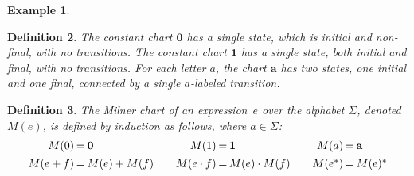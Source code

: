 \documentclass{article}
\newtheorem{definition}{Definition}[section]
\newtheorem{example}[definition]{Example}
\newcommand{\milner}[1]{M(#1)}
\begin{document}
\begin{example}
\begin{center}
\end{center}
\end{example}


\begin{definition}
The constant chart $\mathbf{0}$ has a single state, which is initial and non-final, with no transitions.  
The constant chart $\mathbf{1}$ has a single state, both initial and final, with no transitions.  
For each letter $a$, the chart $\mathbf{a}$ has two states, one initial and one final, 
connected by a single $a$-labeled transition.
\end{definition}

\begin{definition}
The \emph{Milner chart} of an expression~$e$ over the alphabet $\Sigma$, denoted $M(e)$, is defined by induction as follows, 
where  $a \in \Sigma$:
\[
\begin{array}{rclcrclcrcl}
\milner{0} &\hspace{-8pt}=\hspace{-8pt}& \mathbf{0} & &
\milner{1} &\hspace{-8pt}=\hspace{-8pt}& \mathbf{1} &  &
\milner{a} &\hspace{-8pt}=\hspace{-8pt}& \mathbf{a} \\[4pt]
\milner{e+f} &\hspace{-8pt}=\hspace{-8pt}& \milner{e}+\milner{f} & &
\milner{e\cdot f} &\hspace{-8pt}=\hspace{-8pt}& \milner{e}\cdot\milner{f} & &
\milner{e^*} &\hspace{-8pt}=\hspace{-8pt}& \milner{e}^*
\end{array}
\]
\end{definition}
\end{document}
